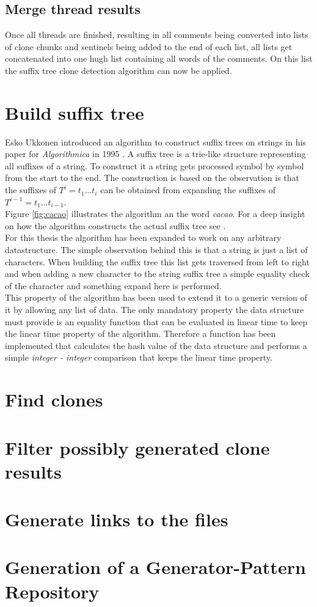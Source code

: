 \subsection{Merge thread results}
Once all threads are finished, resulting in all comments being converted into lists of clone chunks and sentinels being added to the end of each list, all lists get concatenated into one hugh list containing all words of the comments. On this list the suffix tree clone detection algorithm can now be applied.

\section{Build suffix tree}
Esko Ukkonen introduced an algorithm to construct suffix trees on strings in his paper for \textit{Algorithmica} in 1995 \cite{Ukkonen1995}. A suffix tree is a trie-like structure representing all suffixes of a string. To construct it a string gets processed symbol by symbol from the start to the end. The construction is based on the observation is that the suffixes of $T^i = t_1 \dots t_i$ can be obtained from expanding the suffixes of $T^{i-1} = t_1 \dots t_{i-1}$. \\
Figure \ref{fig:cacao} illustrates the algorithm an the word \textit{cacao}. For a deep insight on how the algorithm constructs the actual suffix tree see \cite{Ukkonen1995}.\\
For this thesis the algorithm has been expanded to work on any arbitrary datastructure. The simple observation behind this is that a string is just a list of characters. When building the suffix tree this list gets traversed from left to right and when adding a new character to the string suffix tree a simple equality check of the character and something {\Large expand here} is performed.\\
This property of the algorithm has been used to extend it to a generic version of it by allowing any list of data. The only mandatory property the data structure must provide is an equality function that can be evaluated in linear time to keep the linear time property of the algorithm. Therefore a function has been implemented that calculates the hash value of the data structure and performs a simple \textit{integer - integer} comparison that keeps the linear time property.



\section{Find clones}
\section{Filter possibly generated clone results}
\section{Generate links to the files}
\section{Generation of a Generator-Pattern Repository}